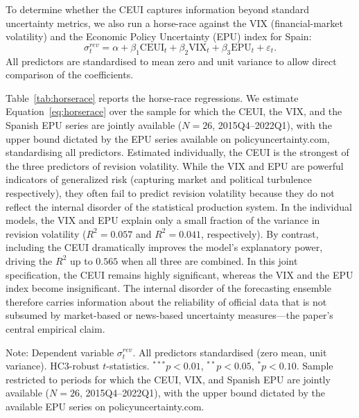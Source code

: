 \documentclass[12pt,a4paper]{article}
\theoremstyle{remark}
\begin{document}
To determine whether the CEUI captures information beyond standard uncertainty metrics, we also run a horse-race against the VIX (financial-market volatility) and the Economic Policy Uncertainty (EPU) index for Spain:
\begin{equation}
\label{eq:horserace}
\sigma^{rev}_t = \alpha + \beta_1 \text{CEUI}_t + \beta_2 \text{VIX}_t
               + \beta_3 \text{EPU}_t + \varepsilon_t .
\end{equation}
All predictors are standardised to mean zero and unit variance to allow direct comparison of the coefficients.

Table~\ref{tab:horserace} reports the horse-race regressions. We estimate Equation~\eqref{eq:horserace} over the sample for which the CEUI, the VIX, and the Spanish EPU series are jointly available ($N = 26$, 2015Q4--2022Q1), with the upper bound dictated by the EPU series available on policyuncertainty.com, standardising all predictors. Estimated individually, the CEUI is the strongest of the three predictors of revision volatility. While the VIX and EPU are powerful indicators of generalized risk (capturing market and political turbulence respectively), they often fail to predict revision volatility because they do not reflect the internal disorder of the statistical production system. In the individual models, the VIX and EPU explain only a small fraction of the variance in revision volatility ($R^2 = 0.057$ and $R^2 = 0.041$, respectively). By contrast, including the CEUI dramatically improves the model's explanatory power, driving the $R^2$ up to $0.565$ when all three are combined. In this joint specification, the CEUI remains highly significant, whereas the VIX and the EPU index become insignificant. The internal disorder of the forecasting ensemble therefore carries information about the reliability of official data that is not subsumed by market-based or news-based uncertainty measures---the paper's central empirical claim.

\begin{table}[ht]
\centering
\begin{threeparttable}
\caption{Horse-Race Regressions: CEUI vs VIX vs EPU as Predictors of Revision Volatility}
\label{tab:horserace}

\begin{tablenotes}
  \small \item Note: Dependent variable $\sigma^{rev}_t$. All predictors standardised (zero mean, unit variance). HC3-robust $t$-statistics. $^{***}p<0.01$, $^{**}p<0.05$, $^{*}p<0.10$. Sample restricted to periods for which the CEUI, VIX, and Spanish EPU are jointly available ($N = 26$, 2015Q4--2022Q1), with the upper bound dictated by the available EPU series on policyuncertainty.com.
\end{tablenotes}
\end{threeparttable}
\end{table}
\end{document}
